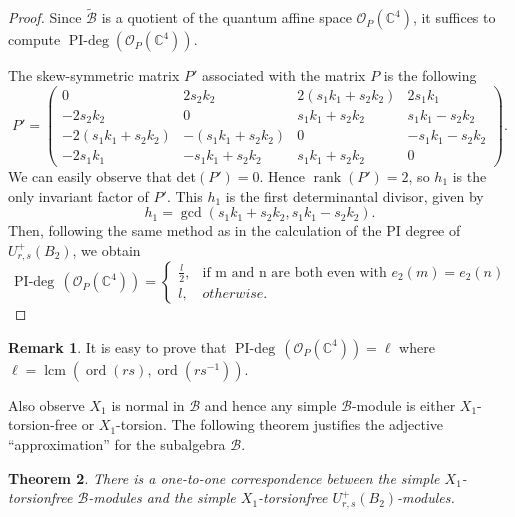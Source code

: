 \documentclass[12 pt,reqno]{amsart}
\numberwithin{equation}{section}
\DeclareMathOperator{\ord}{ord}
\DeclareMathOperator{\pideg}{PI-deg}
\DeclareMathOperator{\ran}{rank}
\newtheorem{thm}{Theorem}[section]
\theoremstyle{definition}
\newtheorem{remark}[thm]{Remark}
\theoremstyle{definition}
\theoremstyle{remark}
\theoremstyle{remark}
\begin{document}
\begin{proof}
    Since $\tilde{\mathcal{B}}$ is a quotient of the quantum affine space $\mathcal{O}_P(\mathbb{C}^4)$, it suffices to compute $\pideg(\mathcal{O}_P(\mathbb{C}^4))$.
    
   \noindent The skew-symmetric matrix $P'$ associated with the matrix $P$ is the following
    $$
P'=\begin{pmatrix}
0 & 2s_2k_2 & 2(s_1k_1 + s_2k_2) & 2s_1k_1 \\
-2s_2k_2 & 0 & s_1k_1 + s_2k_2 & s_1k_1-s_2k_2 \\
-2(s_1k_1 + s_2k_2) & -(s_1k_1 + s_2k_2) & 0 & -s_1k_1 - s_2k_2 \\
-2s_1k_1 & -s_1k_1+s_2k_2 & s_1k_1 + s_2k_2 & 0
\end{pmatrix}.
$$ We can easily observe that det$(P')=0$. Hence $\ran(P')=2$, so $h_1$ is the only invariant factor of $P'$. This $h_1$ is the first determinantal divisor, given by $$h_1=\gcd{(s_1k_1+s_2k_2,s_1k_1-s_2k_2)}.$$
Then, following the same method as in the calculation of the PI degree of $U_{r,s}^+(B_2)$, we obtain 
\[\pideg\, \left({\mathcal{O}_P(\mathbb{C}^4)}\right)=\begin{cases}
        \displaystyle\frac{l}{2},  & \text{if m and n are both even with $e_2(m)=e_2(n)$}\\
        l, & otherwise.
    \end{cases}\]
\end{proof}
\begin{remark}
    It is easy to prove that $\pideg\,
\left(\mathcal{O}_P(\mathbb{C}^4)\right)=\ell$ where $\ell=\operatorname{lcm}(\ord(rs),\ord(rs^{-1}))$.
\end{remark}
Also observe $X_1$ is normal in $\mathcal{B}$ and hence any simple $\mathcal{B}$-module is either $X_1$-torsion-free or $X_1$-torsion.
The following theorem justifies the adjective ``approximation'' for the subalgebra $\mathcal{B}$.
 \begin{thm}\label{itd}
There is a one-to-one correspondence between the simple $X_1$-torsionfree $\mathcal{B}$-modules and the simple $X_1$-torsionfree $U_{r,s}^{+}(B_2)$-modules.
\end{thm}
\end{document}
